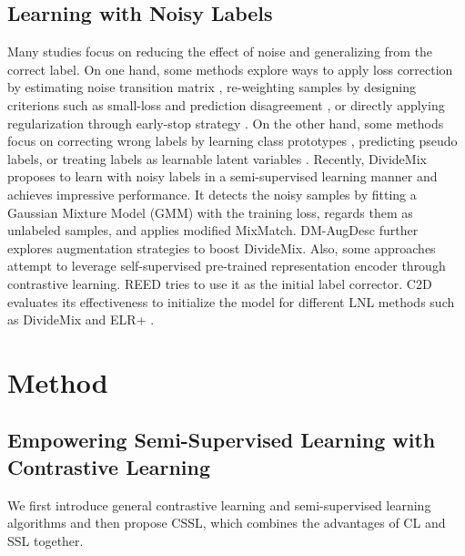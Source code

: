 \documentclass[letterpaper]{article} \usepackage{aaai22}  \usepackage{times}  \usepackage{helvet}  \usepackage{courier}  \usepackage[hyphens]{url}  \usepackage{graphicx} \usepackage{subfigure}
\begin{document}
\subsection{Learning with Noisy Labels}
Many studies focus on reducing the effect of noise and generalizing from the correct label. On one hand, some methods explore ways to apply loss correction by estimating noise transition matrix \cite{patrini2017making,goldberger2016training}, re-weighting samples by designing criterions such as small-loss \cite{jiang2018mentornet,han2018co} and prediction disagreement \cite{malach2017decoupling}, or directly applying regularization through early-stop strategy \cite{liu2020early}. On the other hand, some methods focus on correcting wrong labels by learning class prototypes \cite{han2019deep}, predicting pseudo labels, or treating labels as learnable latent variables \cite{tanaka2018joint,yi2019probabilistic}.
Recently, DivideMix \cite{li2020dividemix} proposes to learn with noisy labels in a semi-supervised learning manner and achieves impressive performance. It detects the noisy samples by fitting a Gaussian Mixture Model (GMM) with the training loss, regards them as unlabeled samples, and applies modified MixMatch. DM-AugDesc \cite{nishi2021augmentation} further explores augmentation strategies to boost DivideMix. Also, some approaches attempt to leverage self-supervised pre-trained representation encoder through contrastive learning. REED \cite{zhang2020decoupling} tries to use it as the initial label corrector. C2D \cite{zheltonozhskii2021contrast} evaluates its effectiveness to initialize the model for different LNL methods such as DivideMix and ELR+ \cite{liu2020early}.



\section{Method}

\subsection{Empowering Semi-Supervised Learning with Contrastive Learning}
We first introduce general contrastive learning and semi-supervised learning algorithms and then propose CSSL, which combines the advantages of CL and SSL together.
\end{document}
